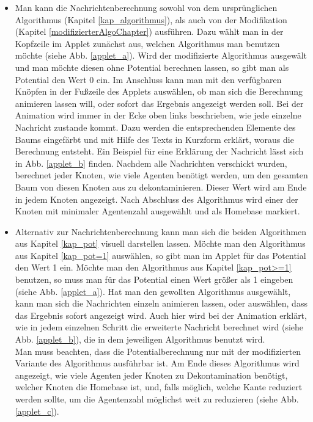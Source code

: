 \begin{itemize}
	\item Man kann die Nachrichtenberechnung sowohl von dem ursprünglichen Algorithmus (Kapitel \ref{kap_algorithmus}), als auch von der Modifikation (Kapitel \ref{modifizierterAlgoChapter}) ausführen. Dazu wählt man in der Kopfzeile im Applet zunächst aus, welchen Algorithmus man benutzen möchte (siehe Abb. \ref{applet_a}). Wird der modifizierte Algorithmus ausgewält und man möchte diesen ohne Potential berechnen lassen, so gibt man als Potential den Wert 0 ein. Im Anschluss kann man mit den verfügbaren Knöpfen in der Fußzeile des Applets auswählen, ob man sich die Berechnung animieren lassen will, oder sofort das Ergebnis angezeigt werden soll. Bei der Animation wird immer in der Ecke oben links beschrieben, wie jede einzelne Nachricht zustande kommt. Dazu werden die entsprechenden Elemente des Baums eingefärbt und mit Hilfe des Texts in Kurzform erklärt, woraus die Berechnung entsteht. Ein Beispiel für eine Erklärung der Nachricht lässt sich in Abb. \ref{applet_b} finden. Nachdem alle Nachrichten verschickt wurden, berechnet jeder Knoten, wie viele Agenten benötigt werden, um den gesamten Baum von diesen Knoten aus zu dekontaminieren. Dieser Wert wird am Ende in jedem Knoten angezeigt. Nach Abschluss des Algorithmus wird einer der Knoten mit minimaler Agentenzahl ausgewählt und als Homebase markiert.
	
	\item Alternativ zur Nachrichtenberechnung kann man sich die beiden Algorithmen aus Kapitel \ref{kap_pot} visuell darstellen lassen. Möchte man den Algorithmus aus Kapitel \ref{kap_pot=1} auswählen, so gibt man im Applet für das Potential den Wert 1 ein. Möchte man den Algorithmus aus Kapitel \ref{kap_pot>=1} benutzen, so muss man für das Potential einen Wert größer als 1 eingeben (siehe Abb. \ref{applet_a}). Hat man den gewollten Algorithmus ausgewählt, kann man sich die Nachrichten einzeln animieren lassen, oder auswählen, dass das Ergebnis sofort angezeigt wird. Auch hier wird bei der Animation erklärt, wie in jedem einzelnen Schritt die erweiterte Nachricht berechnet wird (siehe Abb. \ref{applet_b}), die in dem jeweiligen Algorithmus benutzt wird. \\
	Man muss beachten, dass die Potentialberechnung nur mit der modifizierten Variante des Algorithmus ausführbar ist. Am Ende dieses Algorithmus wird angezeigt, wie viele Agenten jeder Knoten zu Dekontamination benötigt, welcher Knoten die Homebase ist, und, falls möglich, welche Kante reduziert werden sollte, um die Agentenzahl möglichst weit zu reduzieren (siehe Abb. \ref{applet_c}).
	

\end{itemize}
